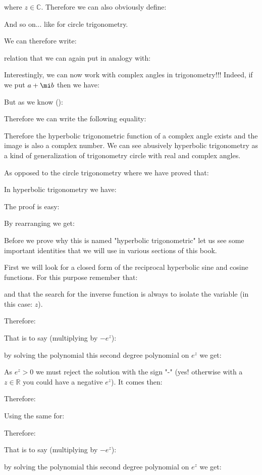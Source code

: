 	where $z \in \mathbb{C}$. Therefore we can also obviously define:
	
	And so on... like for circle trigonometry.

	We can therefore write:
	
	relation that we can again put in analogy with:
	
	Interestingly, we can now work with complex angles in trigonometry!!! Indeed, if we put $a+\mi b$ then we have:
	
	But as we know ():
	
	Therefore we can write the following equality:
	
	Therefore the hyperbolic trigonometric function of a complex angle exists and the image is also a complex number. We can see abusively hyperbolic trigonometry as a kind of generalization of trigonometry circle with real and complex angles.
	
	As opposed to the circle trigonometry where we have proved that:
	
	In hyperbolic trigonometry we have:
	
	The proof is easy:
	
	By rearranging we get:
	
	Before we prove why this is named "hyperbolic trigonometric" let us see some important identities that we will use in various sections of this book.
	
	First we will look for a closed form of the reciprocal hyperbolic sine and cosine functions. For this purpose remember that:
	
	and that the search for the inverse function is always to isolate the variable (in this case: $z$).
	
	Therefore:
	
	That is to say (multiplying by $-e^z$):
	
	by solving the polynomial this second degree polynomial on $e^{z}$ we get:
	
	As $e^{z}>0$ we must reject the solution with the sign "-" (yes! otherwise with a $z \in \mathbb{R}$ you could have a negative $e^z$). It comes then:
	
	Therefore:
	
	Using the same for:
	
	Therefore:
	
	That is to say (multiplying by $-e^z$):
	
	by solving the polynomial this second degree polynomial on $e^{z}$ we get:
	
